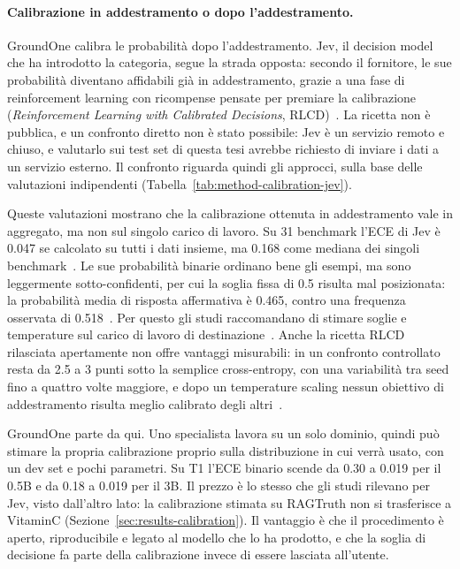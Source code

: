 \paragraph{Calibrazione in addestramento o dopo l'addestramento.} GroundOne calibra le probabilità dopo
l'addestramento. Jev, il decision model che ha introdotto la categoria, segue la strada opposta: secondo il fornitore,
le sue probabilità diventano affidabili già in addestramento, grazie a una fase di reinforcement learning con
ricompense pensate per premiare la calibrazione (\emph{Reinforcement Learning with Calibrated Decisions},
RLCD)~\cite{typesafe2026jev}. La ricetta non è pubblica, e un confronto diretto non è stato possibile: Jev è un
servizio remoto e chiuso, e valutarlo sui test set di questa tesi avrebbe richiesto di inviare i dati a un servizio
esterno. Il confronto riguarda quindi gli approcci, sulla base delle valutazioni indipendenti
(Tabella~\ref{tab:method-calibration-jev}).

Queste valutazioni mostrano che la calibrazione ottenuta in addestramento vale in aggregato, ma non sul singolo
carico di lavoro. Su 31 benchmark l'ECE di Jev è 0.047 se calcolato su tutti i dati insieme, ma 0.168 come mediana dei
singoli benchmark~\cite{guo2026justaskjev}. Le sue probabilità binarie ordinano bene gli esempi, ma sono leggermente
sotto-confidenti, per cui la soglia fissa di 0.5 risulta mal posizionata: la probabilità media di risposta
affermativa è 0.465, contro una frequenza osservata di 0.518~\cite{deusser2026jev}. Per questo gli studi raccomandano
di stimare soglie e temperature sul carico di lavoro di destinazione~\cite{li2026jevjudge}. Anche la ricetta RLCD
rilasciata apertamente non offre vantaggi misurabili: in un confronto controllato resta da 2.5 a 3 punti sotto la
semplice cross-entropy, con una variabilità tra seed fino a quattro volte maggiore, e dopo un temperature scaling
nessun obiettivo di addestramento risulta meglio calibrato degli altri~\cite{deka2026typed}.

GroundOne parte da qui. Uno specialista lavora su un solo dominio, quindi può stimare la propria calibrazione proprio
sulla distribuzione in cui verrà usato, con un dev set e pochi parametri. Su T1 l'ECE binario scende da 0.30 a 0.019
per il 0.5B e da 0.18 a 0.019 per il 3B. Il prezzo è lo stesso che gli studi rilevano per Jev, visto dall'altro lato:
la calibrazione stimata su RAGTruth non si trasferisce a VitaminC (Sezione~\ref{sec:results-calibration}). Il
vantaggio è che il procedimento è aperto, riproducibile e legato al modello che lo ha prodotto, e che la soglia di
decisione fa parte della calibrazione invece di essere lasciata all'utente.

